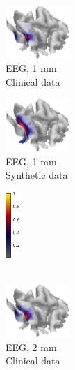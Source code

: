 \documentclass[5p]{elsarticle}
\begin{document}
\begin{figure}[h!]
\begin{footnotesize}
\begin{center}
\begin{minipage}{3cm} \begin{center}
\includegraphics[height=2.0cm]{CM_EEG_G_1mm.png} \\ EEG, 1 mm \\ Clinical data
\end{center}\end{minipage}
\begin{minipage}{3cm} \begin{center}
\includegraphics[height=2.0cm]{CM_EEG_G_1mm_syntheticdata.png} \\ EEG, 1 mm \\ Synthetic data
\end{center}\end{minipage} \begin{minipage}{0.5cm} \begin{center}
\includegraphics[height=2.5cm]{colorbar.png} \\ \mbox{} \\ \mbox{}
\end{center}
\end{minipage} \vskip0.2cm
\begin{minipage}{3cm} \begin{center}
\includegraphics[height=2.0cm]{CM_EEG_G_2mm.png}\\ EEG, 2 mm \\ Clinical data

\end{center}
\end{minipage}
\end{center}
\end{footnotesize}
\end{figure}
\end{document}
